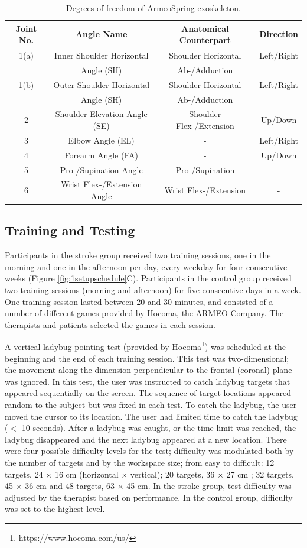\begin{table}
	\begin{tabular}{|c|c|c|c|}
		\hline
		Joint No. & Angle Name & Anatomical Counterpart & Direction \\
		\hline
		1(a) & Inner Shoulder Horizontal & Shoulder Horizontal & Left/Right \\
		& Angle (SH)& Ab-/Adduction &\\ \hline
		1(b) & Outer Shoulder Horizontal & Shoulder Horizontal & Left/Right \\
		& Angle (SH)& Ab-/Adduction &\\ \hline
		2 & Shoulder Elevation Angle (SE) & Shoulder Flex-/Extension & Up/Down \\ \hline
		3 & Elbow Angle (EL) & - & Left/Right \\ \hline
		4 & Forearm Angle (FA) & - & Up/Down \\ \hline
		5 & Pro-/Supination Angle & Pro-/Supination & - \\  \hline
		6 & Wrist Flex-/Extension Angle & Wrist Flex-/Extension & - \\
		\hline
	\end{tabular}
	\caption{Degrees of freedom of ArmeoSpring exoskeleton.}
	\label{tab:devicedof}
\end{table}

\subsection{Training and Testing}
Participants in the stroke group received two training sessions, one in the morning and one in the afternoon per day, every weekday for four consecutive weeks (Figure \ref{fig:1setupschedule}C). 
Participants in the control group received two training sessions (morning and afternoon) for five consecutive days in a week. 
One training session lasted between 20 and 30 minutes, and consisted of a number of different games provided by Hocoma, the ARMEO Company.
The therapists and patients selected the games in each session.  

A vertical ladybug-pointing test (provided by Hocoma\footnote{https://www.hocoma.com/us/}) was scheduled at the beginning and the end of each training session. 
This test was two-dimensional; the movement along the dimension perpendicular to the frontal (coronal) plane was ignored. 
In this test, the user was instructed to catch ladybug targets that appeared sequentially on the screen. 
The sequence of target locations appeared random to the subject but was fixed in each test. 
To catch the ladybug, the user moved the cursor to its location. 
The user had limited time to catch the ladybug ($<$ 10 seconds). 
After a ladybug was caught, or the time limit was reached, the ladybug disappeared and the next ladybug appeared at a new location. 
There were four possible difficulty levels for the test; difficulty was modulated both by the number of targets and by the workspace size; from easy to difficult: 12 targets, 24 × 16 cm (horizontal × vertical);  20 targets, 36 × 27 cm ; 32 targets, 45 × 36 cm and 48 targets, 63 × 45 cm. In the stroke group, test difficulty was adjusted by the therapist based on performance. 
In the control group, difficulty was set to the highest level. 


